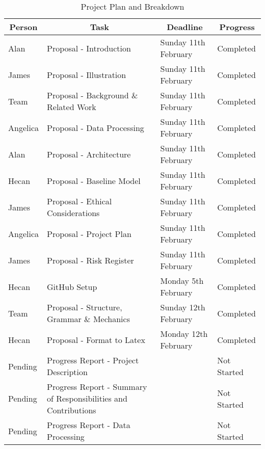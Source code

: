 \documentclass{article} %
\begin{document}
\begin{table}[h]
\caption{Project Plan and Breakdown}
\label{sample-table}
\begin{center}
\begin{tabular}{l|l|l|l}
\hline
\multicolumn{1}{c}{\bf Person} & \multicolumn{1}{c}{\bf Task} & \multicolumn{1}{c}{\bf Deadline} & \multicolumn{1}{c}{\bf Progress} \\
\hline
Alan                & Proposal - Introduction                            & Sunday 11th February & Completed \\
James                & Proposal - Illustration                            & Sunday 11th February & Completed \\
Team           & Proposal - Background \& Related Work              & Sunday 11th February & Completed \\
Angelica       & Proposal - Data Processing                         & Sunday 11th February & Completed \\
Alan                & Proposal - Architecture                            & Sunday 11th February & Completed \\
Hecan                & Proposal - Baseline Model                          & Sunday 11th February & Completed \\
James                & Proposal - Ethical Considerations                  & Sunday 11th February & Completed \\
Angelica                & Proposal - Project Plan                            & Sunday 11th February & Completed \\
James                & Proposal - Risk Register                           & Sunday 11th February & Completed \\
Hecan          & GitHub Setup                                       & Monday 5th February  & Completed \\
Team           & Proposal - Structure, Grammar \& Mechanics        & Sunday 12th February & Completed \\
Hecan          & Proposal - Format to Latex                         & Monday 12th February & Completed \\
Pending                & Progress Report - Project Description              &                      & Not Started \\
Pending                & Progress Report - Summary of Responsibilities and Contributions & & Not Started \\
Pending                & Progress Report - Data Processing                  &                      & Not Started \\

\end{tabular}
\end{center}
\end{table}
\end{document}
